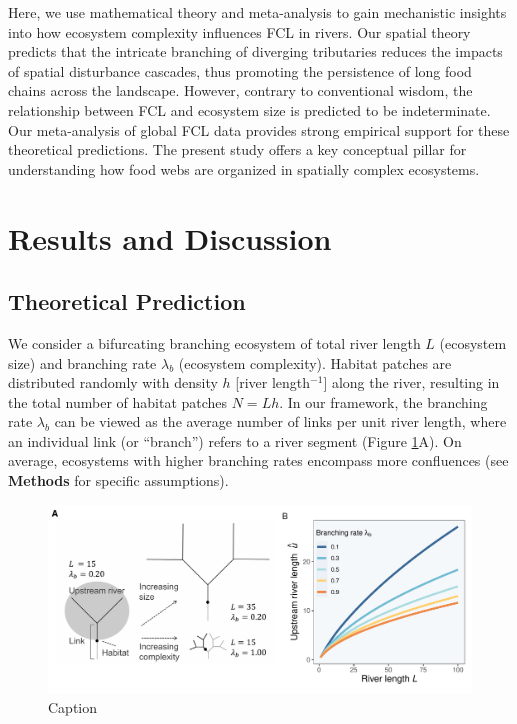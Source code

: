 \documentclass[11pt, class=article, crop=false]{standalone}
\begin{document}
Here, we use mathematical theory and meta-analysis to gain mechanistic insights into how ecosystem complexity influences FCL in rivers.
Our spatial theory predicts that the intricate branching of diverging tributaries reduces the impacts of spatial disturbance cascades, thus promoting the persistence of long food chains across the landscape.
However, contrary to conventional wisdom, the relationship between FCL and ecosystem size is predicted to be indeterminate.
Our meta-analysis of global FCL data provides strong empirical support for these theoretical predictions.
The present study offers a key conceptual pillar for understanding how food webs are organized in spatially complex ecosystems.

\section{Results and Discussion}

\subsection{Theoretical Prediction}

We consider a bifurcating branching ecosystem of total river length $L$ (ecosystem size) and branching rate $\lambda_b$ (ecosystem complexity).
Habitat patches are distributed randomly with density $h$ [river length$^{-1}$] along the river, resulting in the total number of habitat patches $N = Lh$.
In our framework, the branching rate $\lambda_b$ can be viewed as the average number of links per unit river length, where an individual link (or ``branch'') refers to a river segment (Figure \ref{fig:scheme}A).
On average, ecosystems with higher branching rates encompass more confluences (see \textbf{Methods} for specific assumptions).

\begin{figure}
    \centering
    \includegraphics[width=\textwidth]{output/fig_scheme.pdf}
    \caption{Caption}
    \label{fig:scheme}
\end{figure}
\end{document}
